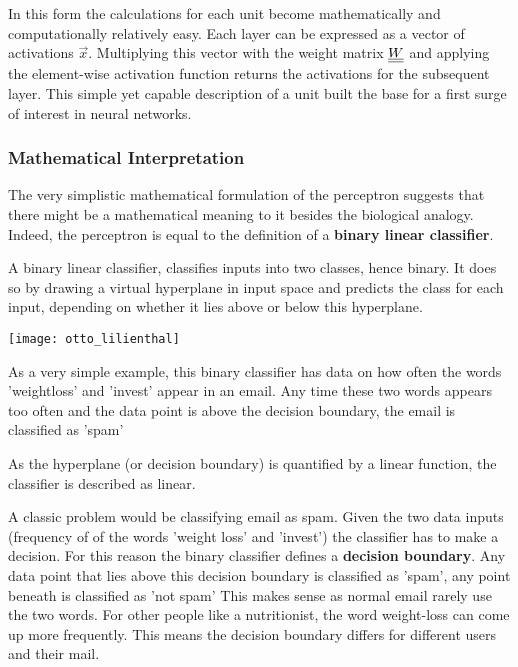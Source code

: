 In this form the calculations for each unit become mathematically and computationally relatively easy.
Each layer can be expressed as a vector of activations $\vec{x}$.
Multiplying this vector with the weight matrix $\underline{\underline{W}}$ and applying the element-wise activation function returns the activations for the subsequent layer.
This simple yet capable description of a unit built the base for a first surge of interest in neural networks.

\subsubsection{Mathematical Interpretation}
The very simplistic mathematical formulation of the perceptron suggests that there might be a mathematical meaning to it besides the biological analogy.
Indeed, the perceptron is equal to the definition of a \textbf{binary linear classifier}.

A binary linear classifier, classifies inputs into two classes, hence binary.
It does so by drawing a virtual hyperplane in input space and predicts the class for each input, depending on whether it lies above or below this hyperplane.
\begin{marginfigure}
    \texttt{[image: otto\_lilienthal]}
    \caption[]{As a very simple example, this binary classifier has data on how often the words 'weightloss' and 'invest' appear in an email.
Any time these two words appears too often and the data point is above the decision boundary, the email is classified as 'spam'}
\end{marginfigure}
As the hyperplane (or decision boundary) is quantified by a linear function, the classifier is described as linear.

A classic problem would be classifying email as spam.
Given the two data inputs (\ie frequency of of the words 'weight loss' and 'invest') the classifier has to make a decision.
For this reason the binary classifier defines a \textbf{decision boundary}.
Any data point that lies above this decision boundary is classified as 'spam', any point beneath is classified as 'not spam'
This makes sense as normal email rarely use the two words.
For other people like a nutritionist, the word weight-loss can come up more frequently.
This means the decision boundary differs for different users and their mail.

